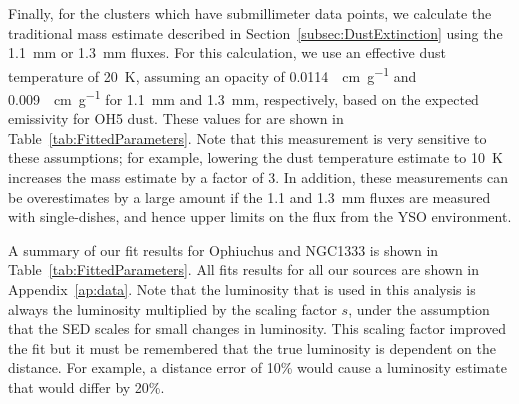 
Finally, for the clusters which have submillimeter data points, we calculate the traditional mass estimate described in Section~\ref{subsec:DustExtinction} using the \SI{1.1}{\milli\meter} or \SI{1.3}{\milli\meter} fluxes. For this calculation, we use an effective dust temperature of \SI{20}{\kelvin}, assuming an opacity of \SI{0.0114}{\centi\meter\per\gram} and \SI{0.009}{\centi\meter\per\gram} for \SI{1.1}{\milli\meter} and \SI{1.3}{\milli\meter}, respectively, based on the
expected emissivity for OH5 dust. These values for \Menv are shown in Table~\ref{tab:FittedParameters}.
Note that this measurement is very sensitive to these assumptions; for example, lowering the dust temperature estimate to \SI{10}{\kelvin} increases the mass estimate by a factor of 3. In addition, these measurements can be overestimates by a large amount if the 1.1 and \SI{1.3}{\milli\meter} fluxes are
measured with single-dishes, and hence upper limits on the flux from the YSO environment.

A summary of our fit results for Ophiuchus and NGC1333 is shown in Table~\ref{tab:FittedParameters}. All fits results for all our sources are shown in Appendix~\ref{ap:data}. Note that the luminosity that is used in this analysis is always the luminosity multiplied by the scaling factor $s$, under the assumption that the SED scales for small changes in luminosity. This scaling factor improved the fit but it must be remembered that the true luminosity is dependent on the distance. For example, a distance error of 10\% would cause a luminosity estimate that would differ by 20\%.


